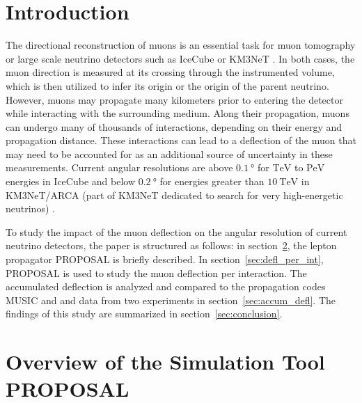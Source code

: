 \section{Introduction}\label{sec:introduction}

The directional reconstruction of muons is an essential task for muon tomography or large scale neutrino detectors such as IceCube 
\cite{IceCube_Instrumentation} or KM3NeT \cite{KM3NeT_Design}. In both cases, the muon direction is measured at its crossing through the instrumented volume, which is then utilized to infer its origin or the origin of the parent neutrino. 
However, muons may propagate many kilometers prior to entering the detector while interacting with the surrounding medium. 
Along their propagation, muons can undergo many of thousands 
of interactions, depending on their energy and propagation distance. 
These interactions can lead to a deflection of the muon that may need to be accounted for as an additional source of uncertainty in these measurements. 
Current angular resolutions are above
$\SI{0.1}{\degree}$ for  
$\si{\tera\electronvolt}$ to $\si{\peta\electronvolt}$ energies in IceCube 
\cite{IceCube_Resolution2021} 
and below 
$\SI{0.2}{\degree}$ for energies greater than $\SI{10}{\tera\electronvolt}$ in 
KM3NeT/ARCA (part of KM3NeT dedicated to search for very high-energetic neutrinos) \cite{KM3NeT_Resolution2021}.

To study the impact of the muon deflection on the angular resolution 
of current neutrino detectors, 
the paper is structured as follows: in section~\ref{sec:proposal},
the lepton propagator PROPOSAL is briefly described. In section~\ref{sec:defl_per_int},
PROPOSAL \cite{koehne2013proposal, dunsch_2018_proposal_improvements} is used to study the muon deflection per interaction.
The accumulated deflection is analyzed and compared to the propagation codes
MUSIC \cite{MUSIC} and  \cite{GEANT4} and data from two experiments in section~\ref{sec:accum_defl}. The findings of this study
are summarized in section~\ref{sec:conclusion}.

\section{Overview of the Simulation Tool PROPOSAL}\label{sec:proposal}

